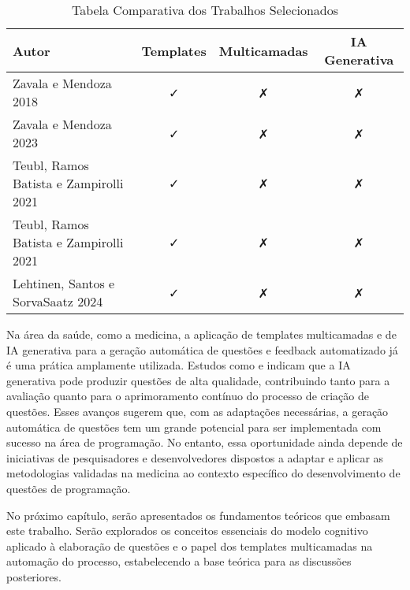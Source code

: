 \begin{table}[htbp]
    \centering
    \begin{tabular}{|l|c|c|c|}
        \hline
        Autor& Templates & Multicamadas & IA Generativa \\ \hline
        Zavala e Mendoza 2018& \faCheck & \faClose& \faClose\\ \hline 
        Zavala e Mendoza 2023 & \faCheck&  \faClose& \faClose\\ \hline
        Teubl, Ramos Batista e Zampirolli 2021 & \faCheck& \faClose& \faClose\\\hline
 Teubl, Ramos Batista e Zampirolli 2021& \faCheck & \faClose&\faClose \\\hline
 Lehtinen, Santos e SorvaSaatz 2024 & \faCheck & \faClose&\faClose \\\hline
    \end{tabular}
    \caption{Tabela Comparativa dos Trabalhos Selecionados}
    \label{tab:table-comparativa-trabalhos-selecionados}
\end{table}



Na área da saúde, como a medicina, a aplicação de templates multicamadas e de IA generativa para a geração automática de questões e feedback automatizado já é uma prática amplamente utilizada. Estudos como \parencite{falcao2023} e \parencite{kiyak2024} indicam que a IA generativa pode produzir questões de alta qualidade, contribuindo tanto para a avaliação quanto para o aprimoramento contínuo do processo de criação de questões. Esses avanços sugerem que, com as adaptações necessárias, a geração automática de questões tem um grande potencial para ser implementada com sucesso na área de programação.
No entanto, essa oportunidade ainda depende de iniciativas de pesquisadores e desenvolvedores dispostos a adaptar e aplicar as metodologias validadas na medicina ao contexto específico do desenvolvimento de questões de programação.

No próximo capítulo, serão apresentados os fundamentos teóricos que embasam este trabalho.  Serão explorados os conceitos essenciais do modelo cognitivo aplicado à elaboração de questões e o papel dos templates multicamadas na automação do processo, estabelecendo a base teórica para as discussões posteriores. 